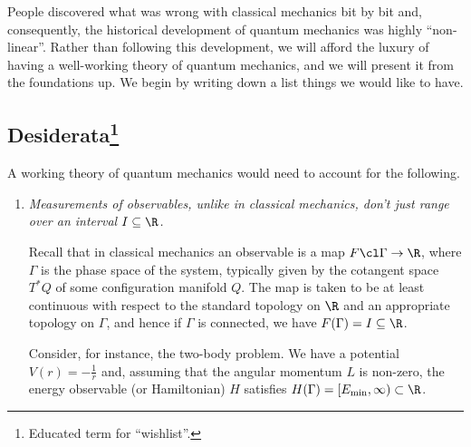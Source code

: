 %
People discovered what was wrong with classical mechanics bit by bit and, consequently, the historical development of quantum mechanics was highly ``non-linear''. Rather than following this development, we will afford the luxury of having a well-working theory of quantum mechanics, and we will present it from the foundations up. We begin by writing down a list things we would like to have. 
\subsection[Desiderata]{Desiderata\protect\footnote{Educated term for ``wishlist''.}}
    A working theory of quantum mechanics would need to account for the following.

    \begin{enumerate}[label=(\alph*)]
        \item \textit{Measurements of observables, unlike in classical mechanics, don't just range over an interval $I\subseteq \R$.}

        Recall that in classical mechanics an observable is a map $F\cl\Gamma\to\R$, where $\Gamma$ is the phase space of the system, typically given by the cotangent space $T^*Q$ of some configuration manifold $Q$. The map is taken to be at least continuous with respect to the standard topology on $\R$ and an appropriate topology on $\Gamma$, and hence if $\Gamma$ is connected, we have $F(\Gamma)=I\subseteq\R$.

        Consider, for instance, the two-body problem. We have a potential $V(r)=-\tfrac{1}{r}$ and, assuming that the angular momentum $L$ is non-zero, the energy observable (or Hamiltonian) $H$ satisfies $H(\Gamma)=[E_{\mathrm{min}},\infty)\subset \R$.


\end{enumerate}
